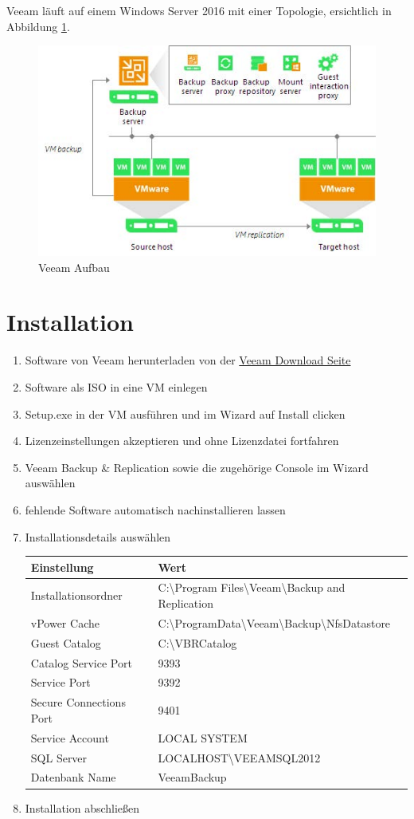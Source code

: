 Veeam läuft auf einem Windows Server 2016 mit einer Topologie,
ersichtlich in Abbildung \ref{veeam-grob}.

\begin{figure}[!htb]
\centering
\includegraphics{./images/veeam_grob.jpg}
\caption{Veeam Aufbau}\label{veeam-grob}
\end{figure}

\hypertarget{installation}{%
\section{Installation}\label{installation}}

\begin{enumerate}
\def\labelenumi{\arabic{enumi}.}
\item
  Software von Veeam herunterladen von der
  \href{www.veeam.com/downloads.html}{Veeam Download Seite}
\item
  Software als ISO in eine VM einlegen
\item
  Setup.exe in der VM ausführen und im Wizard auf Install clicken
\item
  Lizenzeinstellungen akzeptieren und ohne Lizenzdatei fortfahren
\item
  Veeam Backup \& Replication sowie die zugehörige Console im Wizard
  auswählen
\item
  fehlende Software automatisch nachinstallieren lassen
\item
  Installationsdetails auswählen

  \begin{longtable}[]{@{}ll@{}}
  \toprule
  Einstellung & Wert\tabularnewline
  \midrule
  \endhead
  Installationsordner & C:\textbackslash Program
  Files\textbackslash Veeam\textbackslash Backup and
  Replication\tabularnewline
  vPower Cache &
  C:\textbackslash ProgramData\textbackslash Veeam\textbackslash Backup\textbackslash NfsDatastore\tabularnewline
  Guest Catalog & C:\textbackslash VBRCatalog\tabularnewline
  Catalog Service Port & 9393\tabularnewline
  Service Port & 9392\tabularnewline
  Secure Connections Port & 9401\tabularnewline
  Service Account & LOCAL SYSTEM\tabularnewline
  SQL Server & LOCALHOST\textbackslash VEEAMSQL2012\tabularnewline
  Datenbank Name & VeeamBackup\tabularnewline
  \bottomrule
  \end{longtable}
\item
  Installation abschließen
\end{enumerate}

